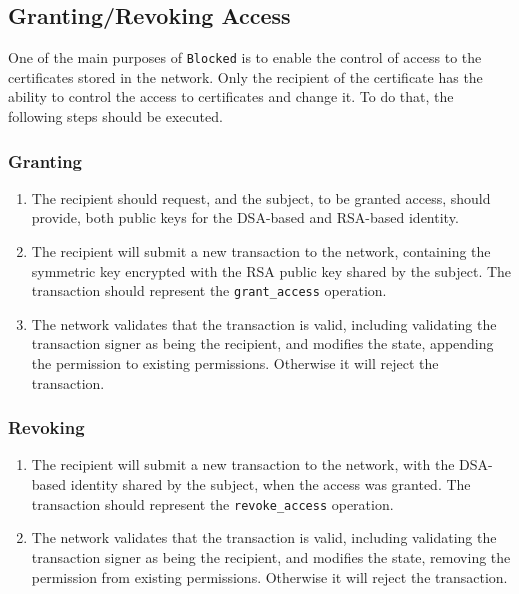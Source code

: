 \subsection{Granting/Revoking Access}

One of the main purposes of \texttt{Blocked} is to enable the control of access to the certificates stored in the network. Only the recipient of the certificate has the ability to control the access to certificates and change it. To do that, the following steps should be executed.

\subsubsection{Granting}

\begin{enumerate}
	\item The recipient should request, and the subject, to be granted access, should provide, both public keys for the DSA-based and RSA-based identity.
	\item The recipient will submit a new transaction to the network, containing the symmetric key encrypted with the RSA public key shared by the subject. The transaction should represent the \texttt{grant\_access} operation.
	\item The network validates that the transaction is valid, including validating the transaction signer as being the recipient, and modifies the state, appending the permission to existing permissions. Otherwise it will reject the transaction.
\end{enumerate}

\subsubsection{Revoking}

\begin{enumerate}
	\item The recipient will submit a new transaction to the network, with the DSA-based identity shared by the subject, when the access was granted. The transaction should represent the \texttt{revoke\_access} operation.
	\item The network validates that the transaction is valid, including validating the transaction signer as being the recipient, and modifies the state, removing the permission from existing permissions. Otherwise it will reject the transaction.
\end{enumerate}

